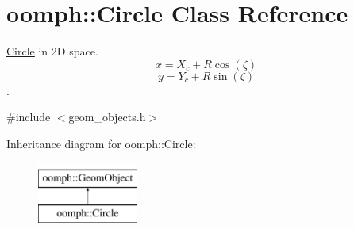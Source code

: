 \hypertarget{classoomph_1_1Circle}{}\section{oomph\+:\+:Circle Class Reference}
\label{classoomph_1_1Circle}


\hyperlink{classoomph_1_1Circle}{Circle} in 2D space. \[ x = X_c + R \cos(\zeta) \] \[ y = Y_c + R \sin(\zeta) \].  




{\ttfamily \#include $<$geom\+\_\+objects.\+h$>$}

Inheritance diagram for oomph\+:\+:Circle\+:\begin{figure}[H]
\begin{center}
\leavevmode
\includegraphics[height=2.000000cm]{classoomph_1_1Circle}
\end{center}
\end{figure}
